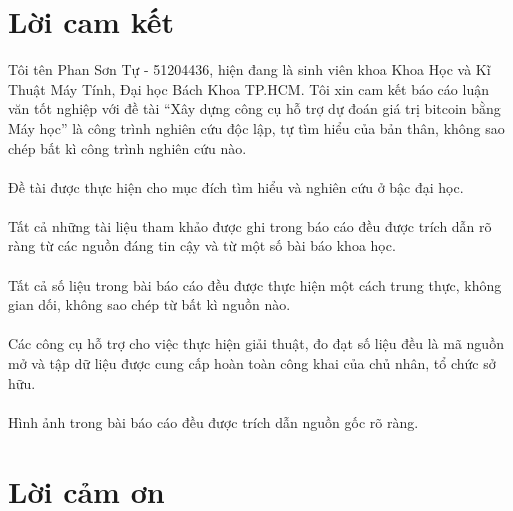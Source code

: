 \section*{Lời cam kết}
\thispagestyle{plain} 
Tôi tên Phan Sơn Tự - 51204436, hiện đang là sinh viên khoa Khoa Học và Kĩ Thuật 
Máy Tính, Đại học Bách Khoa TP.HCM. Tôi xin cam kết báo cáo luận văn tốt nghiệp với đề tài 
``Xây dựng công cụ hỗ trợ dự đoán giá trị bitcoin bằng Máy học'' là công trình nghiên cứu độc lập, 
tự tìm hiểu của bản thân, không sao chép bất kì công trình nghiên cứu nào.\\\\
Đề tài được thực hiện
cho mục đích tìm hiểu và nghiên cứu ở bậc đại học.\\\\
Tất cả những tài liệu tham khảo được ghi trong báo cáo đều được trích dẫn rõ
ràng từ các nguồn đáng tin cậy và từ một số bài báo khoa học.\\\\
Tất cả số liệu trong bài báo cáo đều được thực hiện một cách trung thực,
không gian dối, không sao chép từ bất kì nguồn nào.\\\\
Các công cụ hỗ trợ cho việc thực hiện giải thuật, đo đạt số liệu đều là mã nguồn mở và tập
dữ liệu được cung cấp hoàn toàn công khai của chủ nhân, tổ chức sở hữu.\\\\
Hình ảnh trong bài báo cáo đều được trích dẫn nguồn gốc rõ ràng.
\pagebreak

\section*{Lời cảm ơn}
\thispagestyle{plain} 

